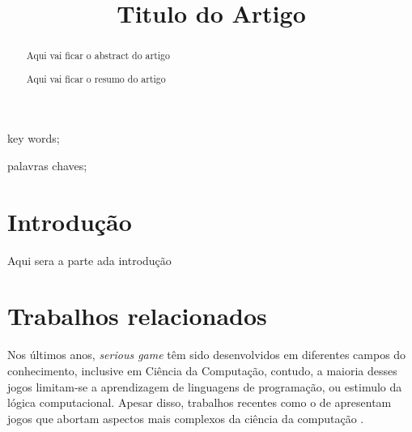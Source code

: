 \documentclass[10pt, conference, compsocconf]{IEEEtran}
\begin{document}
\title{Titulo do Artigo}

\author{
}

\maketitle
\begin{abstract}
Aqui vai ficar o abstract do artigo


\end{abstract}
\begin{IEEEkeywords}
	key words;
\end{IEEEkeywords}

\begin{abstract}
Aqui vai ficar o resumo do artigo
	
\end{abstract}

\begin{IEEEkeywords}
palavras chaves;

\end{IEEEkeywords}

\IEEEpeerreviewmaketitle

\section{Introdução}

Aqui sera a parte ada introdução

\section{Trabalhos relacionados} \label{sec:firstpage}

Nos últimos anos, \textit{serious game} têm sido desenvolvidos em diferentes campos do conhecimento, inclusive em Ciência da Computação, contudo, a maioria desses jogos limitam-se a aprendizagem de linguagens de programação, ou estimulo da lógica computacional. Apesar disso, trabalhos recentes como o de \cite{figueiredo2011wargrafos} apresentam jogos que abortam aspectos mais complexos da ciência da computação \cite{yang2016developing}.
\end{document}
